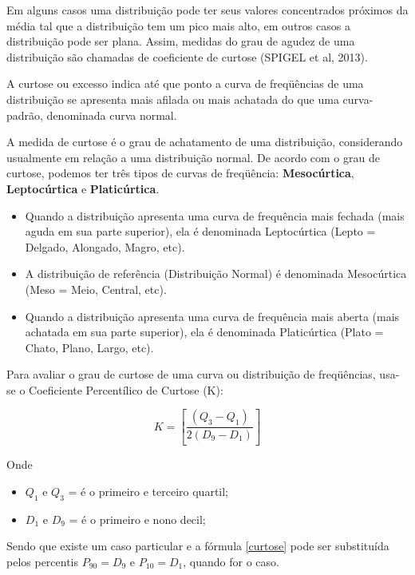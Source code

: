 \inic Em alguns casos uma distribuição pode ter seus valores concentrados próximos da média tal que a distribuição tem um pico mais alto, em outros casos a distribuição pode ser plana. Assim, medidas do grau de agudez de uma distribuição são chamadas de coeficiente de curtose (SPIGEL et al, 2013). \vskip0.3cm

\inic A curtose ou excesso indica até que ponto a curva de freqüências de uma distribuição se apresenta mais afilada ou mais achatada do que uma curva-padrão, denominada curva normal.\vskip0.3cm

\inic A medida de curtose é o grau de achatamento de uma distribuição, considerando usualmente em relação a uma distribuição normal. De acordo com o grau de curtose, podemos ter três tipos de curvas de freqüência: \textbf{Mesocúrtica}, \textbf{Leptocúrtica} e \textbf{Platicúrtica}.\vskip0.3cm

\begin{itemize}
\item Quando a distribuição apresenta uma curva de frequência mais fechada (mais aguda em sua parte superior), ela é denominada Leptocúrtica (Lepto = Delgado, Alongado, Magro, etc).
\item A distribuição de referência (Distribuição Normal) é denominada Mesocúrtica (Meso = Meio, Central, etc).
\item Quando a distribuição apresenta uma curva de frequência mais aberta (mais achatada em sua parte superior), ela é denominada Platicúrtica (Plato = Chato, Plano, Largo, etc).
\end{itemize}

Para avaliar o grau de curtose de uma curva ou distribuição de freqüências, usa-se o Coeficiente Percentílico de Curtose (K):

\begin{equation}\label{curtose}
    K = \left[ \frac{(Q_{3}-Q_{1})}{2(D_{9}-D_{1})} \right]
\end{equation}

Onde

\begin{itemize}
  \item $Q_{1}$ e $Q_{3}$  = é o primeiro e terceiro quartil;
  \item $D_{1}$ e $D_{9}$  = é o primeiro e nono decil;
   \end{itemize}

\vskip0.3cm

Sendo que existe um caso particular e a fórmula \ref{curtose} pode ser substituída
pelos percentis $P_{90}=D_{9}$ e $P_{10}=D_{1}$, quando for o caso.




